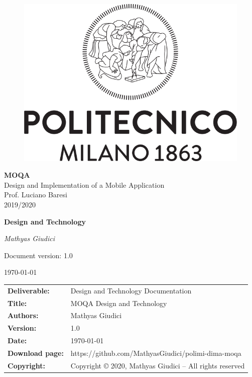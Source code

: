 \documentclass[a4paper,12pt]{report}
\begin{document}
\begin{titlepage}
\centering
	\begin{center}{
		\begin{figure}[h]
		\large
		\centering
		{\includegraphics[width=.70\linewidth]{img/logo_poli}}
        \end{figure}
    	}
	\end{center}
	\vspace{1 cm}
	{\Large {\textbf{\LARGE MOQA} \\
		Design and Implementation of a Mobile Application \\ Prof. Luciano Baresi \\ 2019/2020} \par}
	\vspace{1.5cm}
	{\LARGE \textbf{Design and Technology} \par}
	{\Large\itshape Mathyas Giudici\par}
	\vfill
	{\large Document version: 1.0\par}
	{\large \today \par}
\end{titlepage}

{
\pagestyle{empty}
\begin{table}[h!]
    \begin{tabu} to \textwidth { X[0.3,r,p] X[0.7,l,p] }
        \textbf{Deliverable:} & Design and Technology Documentation\\
        \textbf{Title:} & MOQA Design and Technology \\
        \textbf{Authors:} & Mathyas Giudici\\
        \textbf{Version:} & 1.0 \\
        \textbf{Date:} & \today \\
        \textbf{Download page:} & https://github.com/MathyasGiudici/polimi-dima-moqa \\
        \textbf{Copyright:} & Copyright © 2020, Mathyas Giudici – All rights reserved \\
    \end{tabu}
\end{table}

\clearpage
}
\end{document}

